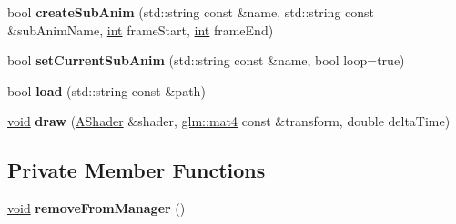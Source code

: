 \begin{DoxyCompactItemize}
\item 
\hypertarget{classgdl_1_1_model_aa712f9125986a0d0ee9520e73a2a0f66}{}bool {\bfseries create\+Sub\+Anim} (std\+::string const \&name, std\+::string const \&sub\+Anim\+Name, \hyperlink{_s_d_l__thread_8h_a6a64f9be4433e4de6e2f2f548cf3c08e}{int} frame\+Start, \hyperlink{_s_d_l__thread_8h_a6a64f9be4433e4de6e2f2f548cf3c08e}{int} frame\+End)\label{classgdl_1_1_model_aa712f9125986a0d0ee9520e73a2a0f66}

\item 
\hypertarget{classgdl_1_1_model_a7167ca64cd426f7bd46756ed33bad12f}{}bool {\bfseries set\+Current\+Sub\+Anim} (std\+::string const \&name, bool loop=true)\label{classgdl_1_1_model_a7167ca64cd426f7bd46756ed33bad12f}

\item 
\hypertarget{classgdl_1_1_model_a73175b246228b1a275a4cf2b59c8d5cd}{}bool {\bfseries load} (std\+::string const \&path)\label{classgdl_1_1_model_a73175b246228b1a275a4cf2b59c8d5cd}

\item 
\hypertarget{classgdl_1_1_model_a57be549452c2bef282709fe02b0072a3}{}\hyperlink{_s_d_l__audio_8h_a52835ae37c4bb905b903cbaf5d04b05f}{void} {\bfseries draw} (\hyperlink{classgdl_1_1_a_shader}{A\+Shader} \&shader, \hyperlink{group__core__types_ga7dcd2365c2e368e6af5b7adeb6a9c8df}{glm\+::mat4} const \&transform, double delta\+Time)\label{classgdl_1_1_model_a57be549452c2bef282709fe02b0072a3}

\end{DoxyCompactItemize}
\subsection*{Private Member Functions}
\begin{DoxyCompactItemize}
\item 
\hypertarget{classgdl_1_1_model_a27dfe1058071caf1285b305ae6c9f5ff}{}\hyperlink{_s_d_l__audio_8h_a52835ae37c4bb905b903cbaf5d04b05f}{void} {\bfseries remove\+From\+Manager} ()\label{classgdl_1_1_model_a27dfe1058071caf1285b305ae6c9f5ff}

\end{DoxyCompactItemize}
